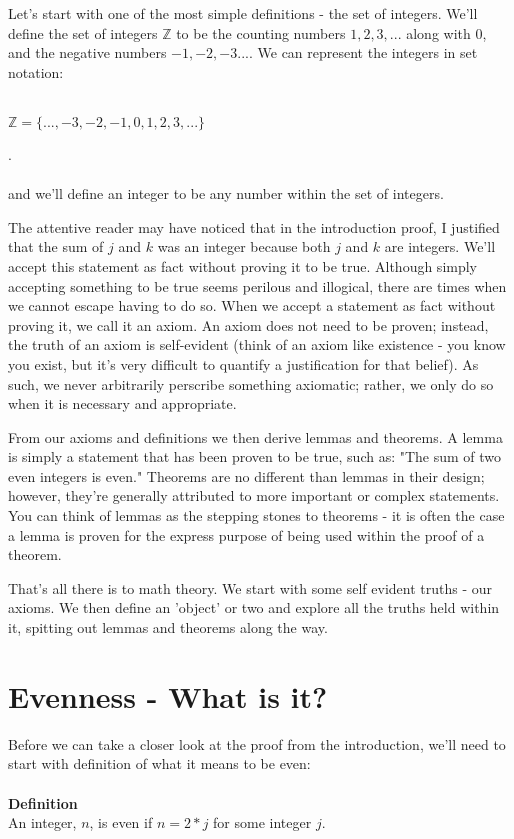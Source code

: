 \documentclass[a4paper,12pt]{article}
\begin{document}
Let's start with one of the most simple definitions - the set of integers. We'll define the set of integers $\mathbb{Z}$ to be the counting numbers $1, 2, 3, ...$ along with $0$, and the negative numbers ${-}1, {-}2, {-}3 ...$. We can represent the integers in set notation: \\
\\
\centerline{$\mathbb{Z} = \{ ..., {-3}, {-2}, {-1}, 0, 1, 2, 3, ... \}$}. \\
\\
and we'll define an integer to be any number within the set of integers.

The attentive reader may have noticed that in the introduction proof, I justified that the sum of $j$ and $k$ was an integer because both $j$ and $k$ are integers. We'll accept this statement as fact without proving it to be true. Although simply accepting something to be true seems perilous and illogical, there are times when we cannot escape having to do so. When we accept a statement as fact without proving it, we call it an axiom. An axiom does not need to be proven; instead, the truth of an axiom is self-evident (think of an axiom like existence - you know you exist, but it's very difficult to quantify a justification for that belief). As such, we never arbitrarily perscribe something axiomatic; rather, we only do so when it is necessary and appropriate.  

From our axioms and definitions we then derive lemmas and theorems. A lemma is simply a statement that has been proven to be true, such as: "The sum of two even integers is even." Theorems are no different than lemmas in their design; however, they're generally attributed to more important or complex statements. You can think of lemmas as the stepping stones to theorems - it is often the case a lemma is proven for the express purpose of being used within the proof of a theorem. 

That's all there is to math theory. We start with some self evident truths - our axioms. We then define an 'object' or two and explore all the truths held within it, spitting out lemmas and theorems along the way. 

\section{Evenness - What is it?}
Before we can take a closer look at the proof from the introduction, we'll need to start with definition of what it means to be even: \\
\\
\textbf{Definition} \\
An integer, $n$, is even if $n = 2*j$ for some integer $j$. \\
\end{document}
